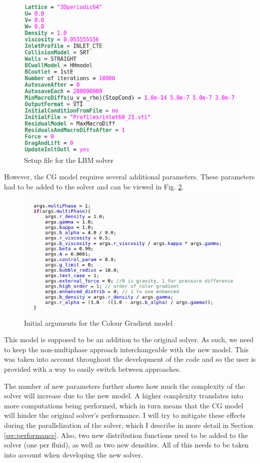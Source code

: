 \documentclass[12pt, openany]{book}
\begin{document}
\begin{figure}[H]
	\centering
	\includegraphics[width=0.9\linewidth]{Resources/Images/setup.png}
	\caption{Setup file for the LBM solver}
	\label{fig:setupLBM}
\end{figure}
 However, the CG model requires several additional parameters. These parameters had to be added to the solver and can be viewed in Fig. \ref{fig:setupCG}.
\begin{figure}[H]
	\centering
	\includegraphics[width=0.9\linewidth]{Resources/Images/setupCG.png}
	\caption{Initial arguments for the Colour Gradient model}
	\label{fig:setupCG}
\end{figure}

This model is supposed to be an addition to the original solver. As such, we need to keep the non-multiphase approach interchangeable with the new model. This was taken into account throughout the development of the code and so the user is provided with a way to easily switch between approaches. \par
The number of new parameters further shows how much the complexity of the solver will increase due to the new model. A higher complexity translates into more computations being performed, which in turn means that the CG model will hinder the original solver's performance. I will try to mitigate these effects during the parallelization of the solver, which I describe in more detail in Section \ref{sec:performance}. Also, two new distribution functions need to be added to the solver (one per fluid), as well as two new densities. All of this needs to be taken into account when developing the new solver.
\end{document}
